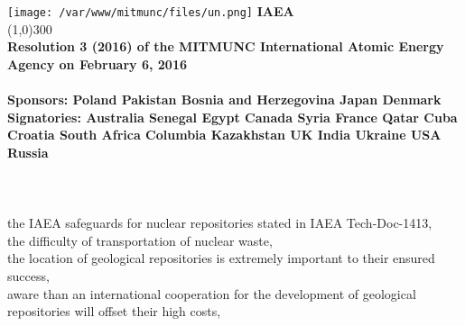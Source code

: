 \documentclass{article}
\begin{document}
\begin{center}
\end{center}
\texttt{[image: /var/www/mitmunc/files/un.png]}
\label{UN LOGO}
 \Large{\bf IAEA}\\
\linethickness{.5mm}
\line(1,0){300} \\
\normalsize{\bf Resolution 3 (2016)
of the MITMUNC International Atomic Energy Agency on February 6, 2016\\ \\
Sponsors: Poland Pakistan Bosnia and Herzegovina Japan Denmark \\
Signatories: Australia Senegal Egypt Canada Syria France Qatar Cuba Croatia South Africa Columbia Kazakhstan UK India Ukraine USA Russia \\ \\
} \\

\\

 the IAEA safeguards for nuclear repositories stated in IAEA Tech-Doc-1413, \\
 the difficulty of transportation of nuclear waste, \\
 the location of geological repositories is extremely important to their ensured success, \\
 aware than an international cooperation for the development of geological repositories will offset their high costs, \\
\end{document}
